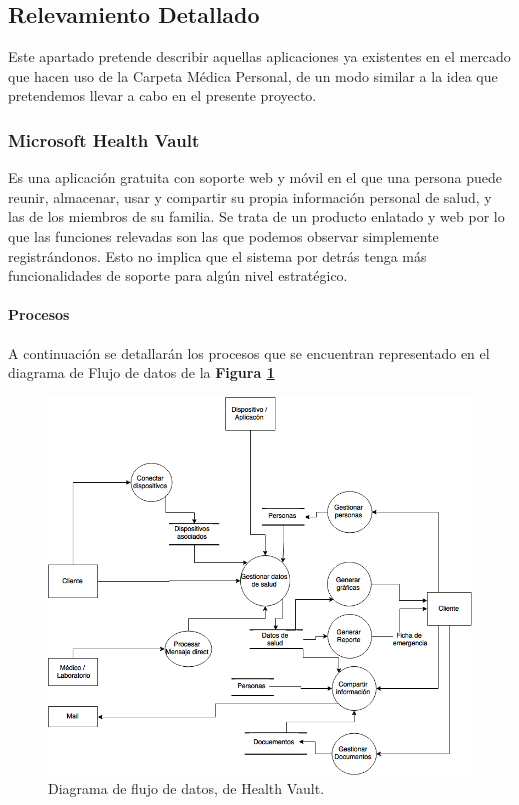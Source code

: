 \clearpage
\subsection{Relevamiento Detallado}
Este apartado pretende describir aquellas aplicaciones ya existentes en el mercado que hacen uso de la Carpeta Médica Personal, de un modo similar a la idea que pretendemos llevar a cabo en el presente proyecto.


\subsubsection{Microsoft Health Vault}
	 Es una aplicación gratuita con soporte web y móvil en el que una persona puede reunir, almacenar, usar y compartir su propia información personal de salud, y las de los miembros de su familia. Se trata de un producto enlatado y web por lo que las funciones relevadas son las que podemos observar simplemente registrándonos.
     Esto no implica que el sistema por detrás tenga más funcionalidades de soporte para algún nivel estratégico.
	
\paragraph{Procesos}


A continuación se detallarán los procesos que se encuentran representado en el diagrama de Flujo de datos de la \textbf{Figura \ref{hv_data_flow}}

	\begin{figure}[h]
      \centering
      \includegraphics[width=.8\textwidth]{img/tp1/hv_flujo_de_datos}
      \caption{Diagrama de flujo de datos, de Health Vault.}
      \label{hv_data_flow}
    \end{figure} 


